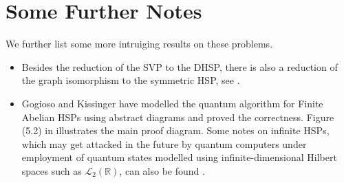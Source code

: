 \documentclass[10pt]{amsart}
\theoremstyle{definition}
\theoremstyle{remark}
\begin{document}


    \section{Some Further Notes} \phantom{}

    We further list some more intruiging results on these problems.
    \begin{itemize}[wide]
      \item Besides the reduction of the SVP to the DHSP, there is also a reduction of the graph isomorphism to the symmetric HSP, see \cite[pp. 61-64]{Lomont2004}.
      \item Gogioso and Kissinger \cite{Gogioso2017} have modelled the quantum algorithm for Finite Abelian HSPs using abstract diagrams and proved the correctness. Figure (5.2) in \cite[p. 12]{Gogioso2017} illustrates the main proof diagram. Some notes on infinite HSPs, which may get attacked in the future by quantum computers under employment of quantum states modelled using infinite-dimensional Hilbert spaces such as \(\mathcal{L}_2(\mathbb{R})\), can also be found \cite[p. 19]{Gogioso2017}.
    \end{itemize}


    \printbibliography{}
\end{document}
